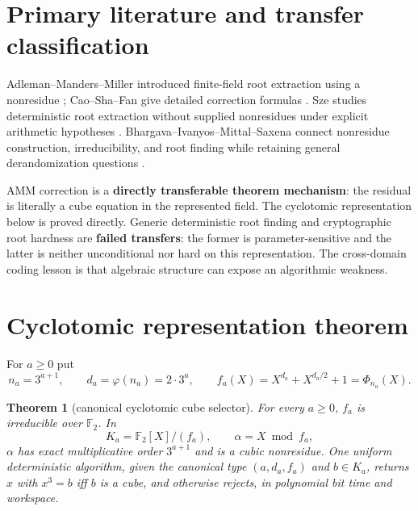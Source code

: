 \documentclass[11pt]{article}
\newtheorem{theorem}{Theorem}
\newcommand{\F}{\mathbb F_2}
\begin{document}
\section{Primary literature and transfer classification}
Adleman--Manders--Miller introduced finite-field root extraction using a
nonresidue \cite{AMM}; Cao--Sha--Fan give detailed correction formulas
\cite{Cao}.  Sze studies deterministic root extraction without supplied
nonresidues under explicit arithmetic hypotheses \cite{Sze}.
Bhargava--Ivanyos--Mittal--Saxena connect nonresidue construction,
irreducibility, and root finding while retaining general derandomization
questions \cite{BIMS}.

AMM correction is a \textbf{directly transferable theorem mechanism}: the
residual is literally a cube equation in the represented field.  The
cyclotomic representation below is proved directly.  Generic deterministic
root finding and cryptographic root hardness are \textbf{failed transfers}:
the former is parameter-sensitive and the latter is neither unconditional
nor hard on this representation.  The cross-domain coding lesson is that
algebraic structure can expose an algorithmic weakness.

\section{Cyclotomic representation theorem}
For $a\ge0$ put
\[
 n_a=3^{a+1},\qquad d_a=\varphi(n_a)=2\cdot3^a,\qquad
 f_a(X)=X^{d_a}+X^{d_a/2}+1=\Phi_{n_a}(X).
\]

\begin{theorem}[canonical cyclotomic cube selector]
For every $a\ge0$, $f_a$ is irreducible over $\F$.  In
\[
 K_a=\F[X]/(f_a),\qquad \alpha=X\bmod f_a,
\]
$\alpha$ has exact multiplicative order $3^{a+1}$ and is a cubic
nonresidue.  One uniform deterministic algorithm, given the canonical type
$(a,d_a,f_a)$ and $b\in K_a$, returns $x$ with $x^3=b$ iff $b$ is a cube,
and otherwise rejects, in polynomial bit time and workspace.
\end{theorem}
\end{document}
